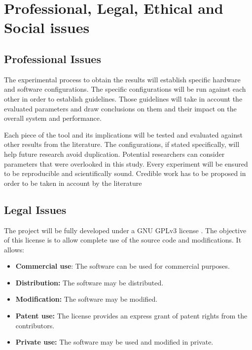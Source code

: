 
\chapter{Professional, Legal, Ethical and Social issues} %

\label{Chapter4} %



\section{Professional Issues}

The experimental process to obtain the results will establish specific hardware and software configurations. The specific configurations will be run against each other in order to establish guidelines. Those guidelines will take in account the evaluated parameters and draw conclusions on them and their impact on the overall system and performance.

Each piece of the tool and its implications will be tested and evaluated against other results from the literature. The configurations, if stated specifically, will help future research avoid duplication. Potential researchers can consider parameters that were overlooked in this study. Every experiment will be ensured to be reproducible and scientifically sound. Credible work has to be proposed in order to be taken in account by the literature


\section{Legal Issues}

The project will be fully developed under a GNU GPLv3 license \cite{GNUGPL}. The objective of this license is to allow complete use of the source code and modifications. It allows:

\begin{itemize}
  \item \textbf{Commercial use}: The software can be used for commercial purposes.
  \item \textbf{Distribution:} The software may be distributed.
  \item \textbf{Modification:} The software may be modified.
  \item \textbf{Patent use:} The license provides an express grant of patent rights from the contributors.
  \item \textbf{Private use:} The software may be used and modified in private.
\end{itemize}

